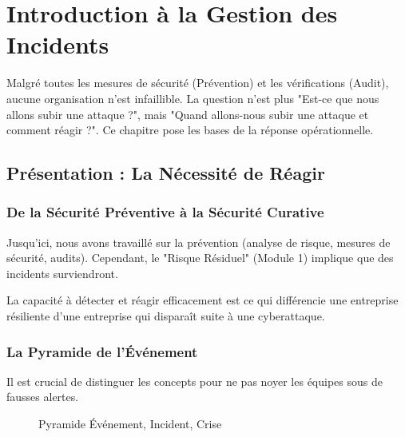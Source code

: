 \chapter{Introduction à la Gestion des Incidents}
\label{chap:introincidents}

Malgré toutes les mesures de sécurité (Prévention) et les vérifications (Audit), aucune organisation n'est infaillible. La question n'est plus "Est-ce que nous allons subir une attaque ?", mais "Quand allons-nous subir une attaque et comment réagir ?". Ce chapitre pose les bases de la réponse opérationnelle.

\section{Présentation : La Nécessité de Réagir}

\subsection{De la Sécurité Préventive à la Sécurité Curative}

Jusqu'ici, nous avons travaillé sur la prévention (analyse de risque, mesures de sécurité, audits). Cependant, le "Risque Résiduel" (Module 1) implique que des incidents surviendront.

La capacité à détecter et réagir efficacement est ce qui différencie une entreprise résiliente d'une entreprise qui disparaît suite à une cyberattaque.

\subsection{La Pyramide de l'Événement}

Il est crucial de distinguer les concepts pour ne pas noyer les équipes sous de fausses alertes.

\begin{figure}[htbp]
\centering
{}
\caption{Pyramide Événement, Incident, Crise}
\end{figure}

